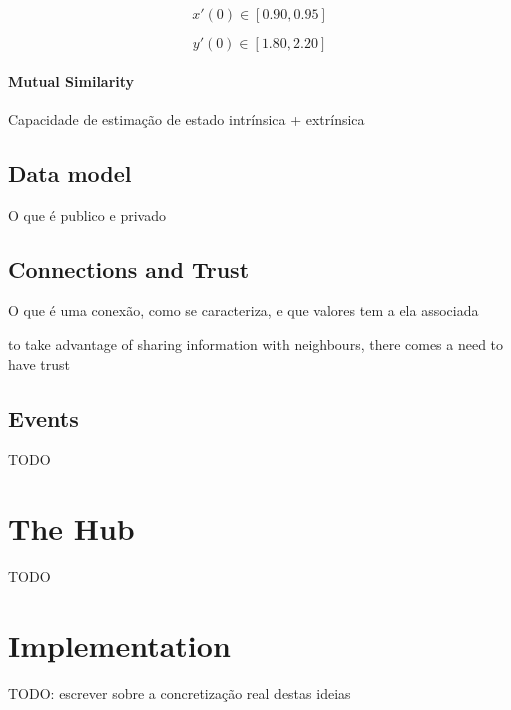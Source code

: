 \begin{equation}
    x'(0) \in [0.90, 0.95]
\end{equation}

\begin{equation}
    y'(0) \in [1.80, 2.20]
\end{equation}

\paragraph{Mutual Similarity}
Capacidade de estimação de estado intrínsica + extrínsica

\subsection{Data model}

O que é publico e privado

\subsection{Connections and Trust}
O que é uma conexão, como se caracteriza, e que valores tem a ela associada

to take advantage of sharing information with neighbours, there comes a need to have trust

\subsection{Events}

TODO


\section{The Hub}

TODO

\section{Implementation}

TODO: escrever sobre a concretização real destas ideias